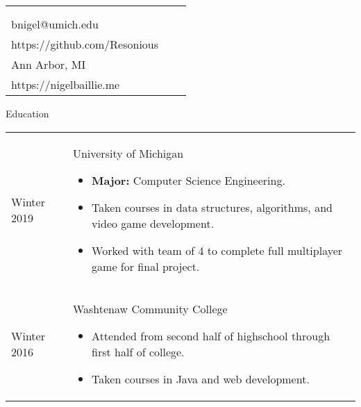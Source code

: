 \documentclass[11pt]{article}
\makeatletter
\def \address{Ann Arbor, MI}
\def \author{Nigel Baillie}
\def \email{bnigel@umich.edu}
\def \phonenumber{(734) 678-5328}
\def \bday{Born April $11^{\text{th}}$ 1995}
\def \github{https://github.com/Resonious}
\def \homepage{https://nigelbaillie.me}
\renewcommand{\section}[1]{{\Huge{#1}}\vspace{2 mm}}
\newenvironment{timeline}
        {\begin{tabular}{p{21 mm}|p{150 mm}}}
        {\end{tabular}}
\newenvironment{timelinetitle}
        {\vspace{-2 mm}\begin{large}}
        {\end{large}\vspace{-1.5 mm}}
\newcommand{\timespan}[2]{{#2}\newline{#1}}
\makeatother
\begin{document}
\newlength{\rcollength}\setlength{\rcollength}{3.0in}%
\begin{tabular} {
  p{}
  p{}
  p{}
}
  \begin{flushleft}
    {\Huge{\author}}\\
    \vspace{1.5 mm}
  \end{flushleft}
  &
  \begin{center}
    {\phonenumber}\\
    {\email}\\
    {\github}
  \end{center}
  &
  \begin{flushright}
    {\bday}\\
    {\address}\\
    {\homepage}
  \end{flushright}
\end{tabular}

\section{Education}

\begin{timeline}
\timespan{Fall 2016}{Winter 2019}
&
\begin{timelinetitle}
    University of Michigan
\end{timelinetitle}
\begin{itemize}
  \item \textbf{Major:} Computer Science Engineering.
  \item Taken courses in data structures, algorithms, and video game development.
  \item Worked with team of 4 to complete full multiplayer game for final project.
\end{itemize}

\\

\timespan{Fall 2012}{Winter 2016}
&
\begin{timelinetitle}
    Washtenaw Community College
\end{timelinetitle}
\begin{itemize}
  \item Attended from second half of highschool through first half of college.
  \item Taken courses in Java and web development.
\end{itemize}

\end{timeline}
\end{document}
